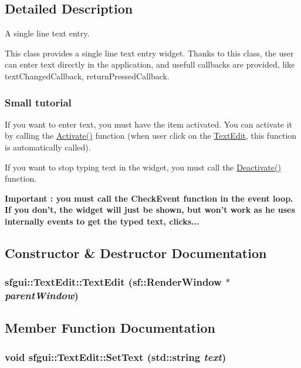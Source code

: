 \subsection{Detailed Description}
A single line text entry. 

This class provides a single line text entry widget. Thanks to this class, the user can enter text directly in the application, and usefull callbacks are provided, like textChangedCallback, returnPressedCallback.

\subsubsection*{Small tutorial}

If you want to enter text, you must have the item activated. You can activate it by calling the \hyperlink{classsfgui_1_1TextEdit_bcd256e053ae8f13a5c7f919f79c03c9}{Activate()} function (when user click on the \hyperlink{classsfgui_1_1TextEdit}{TextEdit}, this function is automatically called). \par
 If you want to stop typing text in the widget, you must call the \hyperlink{classsfgui_1_1TextEdit_49b0919fd6c43c35913f8a46a6788270}{Deactivate()} function. \par
 {\bf Important : you must call the CheckEvent function in the event loop. If you don't, the widget will just be shown, but won't work as he uses internally events to get the typed text, clicks...} 

\subsection{Constructor \& Destructor Documentation}
\hypertarget{classsfgui_1_1TextEdit_c6f2d938ccf876f05a9a9c47060c6093}{
\subsubsection[TextEdit]{\setlength{\rightskip}{0pt plus 5cm}sfgui::TextEdit::TextEdit (sf::RenderWindow $\ast$ {\em parentWindow})}}
\label{classsfgui_1_1TextEdit_c6f2d938ccf876f05a9a9c47060c6093}




\subsection{Member Function Documentation}
\hypertarget{classsfgui_1_1TextEdit_c6f06a7dc81611a50226e10287e87e1e}{
\subsubsection[SetText]{\setlength{\rightskip}{0pt plus 5cm}void sfgui::TextEdit::SetText (std::string {\em text})}}
\label{classsfgui_1_1TextEdit_c6f06a7dc81611a50226e10287e87e1e}




